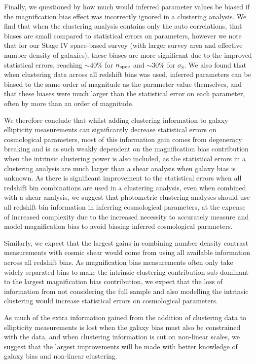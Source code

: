 \documentclass[useAMS,usenatbib,times,letter,amssymb]{mn2e}
\begin{document}
Finally, we questioned by how much would inferred parameter values be biased if the magnification bias effect was incorrectly ignored in a clustering analysis. We find that when the clustering analysis contains only the auto correlations, that biases are small compared to statistical errors on parameters, however we note that for our Stage IV space-based survey (with larger survey area and effective number density of galaxies), these biases are more significant due to the improved statistical errors, reaching $\sim 40\%$ for $n_{\rm spec}$ and $\sim 30\%$ for $\sigma_8$. We also found that when clustering data across all redshift bins was used, inferred parameters can be biased to the same order of magnitude as the parameter value themselves, and that these biases were much larger than the statistical error on each parameter, often by more than an order of magnitude. 

We therefore conclude that whilst adding clustering information to galaxy ellipticity measurements can significantly decrease statistical errors on cosmological parameters, most of this information gain comes from degeneracy breaking and is as such weakly dependent on the magnification bias contribution when the intrinsic clustering power is also included, as the statistical errors in a clustering analysis are much larger than a shear analysis when galaxy bias is unknown. As there is significant improvement to the statistical errors when all redshift bin combinations are used in a clustering analysis, even when combined with a shear analysis, we suggest that photometric clustering analyses should use all redshift bin information in inferring cosmological parameters, at the expense of increased complexity due to the increased necessity to accurately measure and model magnification bias to avoid biasing inferred cosmological parameters.

Similarly, we expect that the largest gains in combining number density contrast measurements with cosmic shear would come from using all available information across all redshift bins. As magnification bias measurements often only take widely separated bins to make the intrinsic clustering contribution sub dominant to the largest magnification bias contribution, we expect that the loss of information from not considering the full sample and also modelling the intrinsic clustering would increase statistical errors on cosmological parameters. %

As much of the extra information gained from the addition of clustering data to ellipticity measurements is lost when the galaxy bias must also be constrained with the data, and when clustering information is cut on non-linear scales, we suggest that the largest improvements will be made with better knowledge of galaxy bias and non-linear clustering. 
\end{document}
